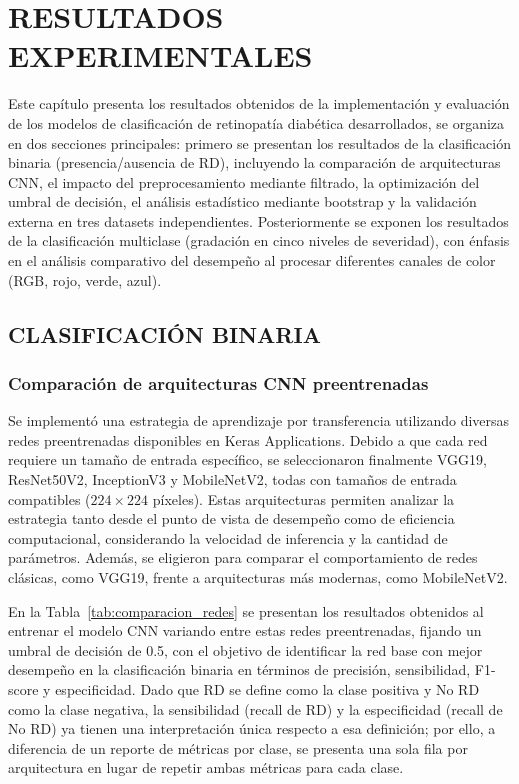 \chapter{RESULTADOS EXPERIMENTALES} \label{chap:resultados}

Este capítulo presenta los resultados obtenidos de la implementación y evaluación de los 
modelos de clasificación de retinopatía diabética desarrollados, se organiza en dos secciones principales: 
primero se presentan los resultados de la clasificación binaria (presencia/ausencia de 
RD), incluyendo la comparación de arquitecturas CNN, el impacto del preprocesamiento 
mediante filtrado, la optimización del umbral de decisión, el análisis estadístico 
mediante bootstrap y la validación externa en tres datasets independientes. 
Posteriormente se exponen los resultados de la clasificación multiclase (gradación en 
cinco niveles de severidad), con énfasis en el análisis comparativo del desempeño al 
procesar diferentes canales de color (RGB, rojo, verde, azul).

\section{CLASIFICACIÓN BINARIA}

\subsection{Comparación de arquitecturas CNN preentrenadas}

Se implementó una estrategia de aprendizaje por transferencia utilizando diversas redes 
preentrenadas disponibles en Keras Applications. Debido a que cada red requiere un tamaño 
de entrada específico, se seleccionaron finalmente VGG19, ResNet50V2, InceptionV3 y 
MobileNetV2, todas con tamaños de entrada compatibles ($224 \times 224$ píxeles). Estas 
arquitecturas permiten analizar la estrategia tanto desde el punto de vista de desempeño 
como de eficiencia computacional, considerando la velocidad de inferencia y la cantidad 
de parámetros. Además, se eligieron para comparar el comportamiento de redes clásicas, 
como VGG19, frente a arquitecturas más modernas, como MobileNetV2.

En la Tabla~\ref{tab:comparacion_redes} se presentan los resultados obtenidos al entrenar
el modelo CNN variando entre estas redes preentrenadas, fijando un umbral de decisión de
0.5, con el objetivo de identificar la red base con mejor desempeño en la clasificación
binaria en términos de precisión, sensibilidad, F1-score y especificidad. Dado que RD se
define como la clase positiva y No RD como la clase negativa, la sensibilidad (recall de
RD) y la especificidad (recall de No RD) ya tienen una interpretación única respecto a
esa definición; por ello, a diferencia de un reporte de métricas por clase, se presenta
una sola fila por arquitectura en lugar de repetir ambas métricas para cada clase.

